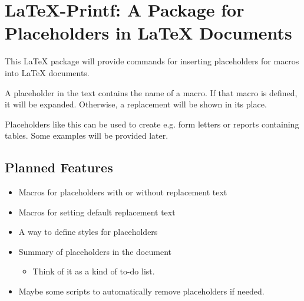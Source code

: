 \documentclass{scrartcl}
\begin{document}
\section*{\LaTeX-Printf: A Package for Placeholders in LaTeX Documents}

This LaTeX package will provide commands for inserting placeholders for macros
into LaTeX documents.

A placeholder in the text contains the name of a macro.
If that macro is defined, it will be expanded.
Otherwise, a replacement will be shown in its place.

Placeholders like this can be used to create e.g. form letters or reports containing
tables. Some examples will be provided later.

\subsection*{Planned Features}

\begin{itemize}
    \item Macros for placeholders with or without replacement text
    \item Macros for setting default replacement text
    \item A way to define styles for placeholders
    \item Summary of placeholders in the document
      \begin{itemize}
          \item Think of it as a kind of to-do list.
      \end{itemize}
    \item Maybe some scripts to automatically remove placeholders if needed.
\end{itemize}
\end{document}
